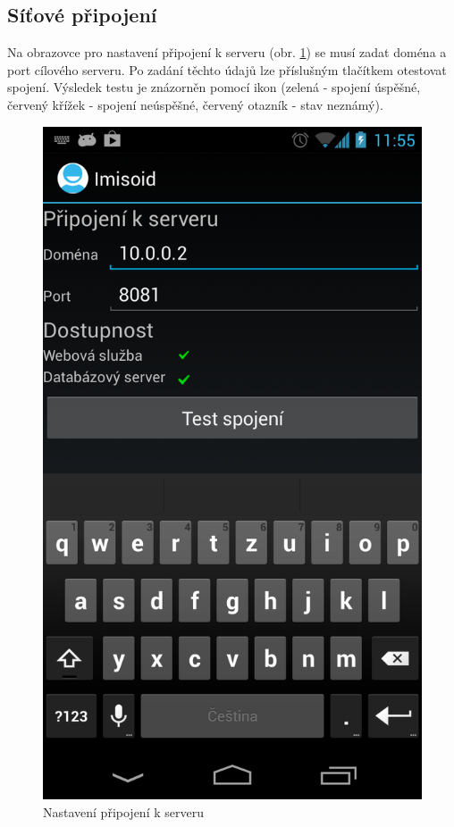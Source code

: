 \documentclass{diplomka}
\begin{document}
\newpage
\subsection{Síťové připojení}
\label{sec:network}
Na obrazovce pro nastavení připojení k serveru (obr. \ref{fig:network}) se musí zadat doména a port cílového serveru. Po zadání těchto údajů lze příslušným tlačítkem otestovat spojení. Výsledek testu je znázorněn pomocí ikon (zelená - spojení úspěšné, červený křížek - spojení neúspěšné, červený otazník - stav neznámý).

\begin{figure}[H]
  \centering
  \includegraphics[scale=0.25]{scr/network.png}
    \caption{Nastavení připojení k serveru}
  \label{fig:network}
\end{figure}
\end{document}
